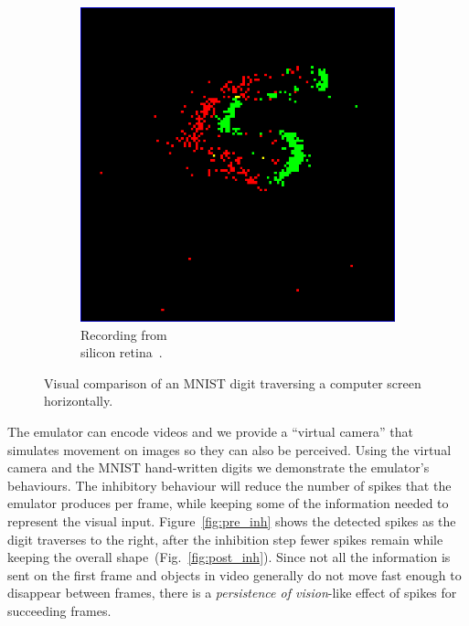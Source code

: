 \documentclass[conference]{IEEEtran}
\begin{document}
\begin{figure}[htb]
\begin{subfigure}[b]{0.24\textwidth}
  \includegraphics[width=\textwidth]{dvs_demo}
  \caption{Recording from \\silicon retina~\cite{bernabeDVS}.}
  \label{fig:dvs_demo}
\end{subfigure}
  
  \caption{Visual comparison of an MNIST digit traversing a computer screen horizontally.}
  \label{fig:dvs_vs_cam}
  
\end{figure}


The emulator can encode videos and we provide a ``virtual camera'' that simulates movement on images so they can also be perceived. Using the virtual camera and the MNIST hand-written digits we demonstrate the emulator's behaviours. The inhibitory behaviour will reduce the number of spikes that the emulator produces per frame, while keeping some of the information needed to represent the visual input. Figure~\ref{fig:pre_inh} shows the detected spikes as the digit traverses to the right, after the inhibition step fewer spikes remain while keeping the overall shape~(Fig.~\ref{fig:post_inh}). Since not all the information is sent on the first frame and objects in video generally do not move fast enough to disappear between frames, there is a \textit{persistence of vision}-like effect of spikes for succeeding frames.
\end{document}
